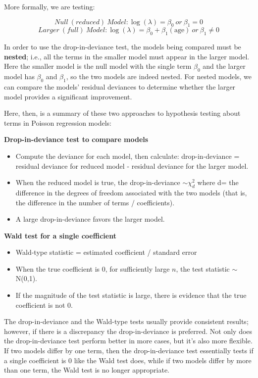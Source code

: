 \documentclass[
]{krantz}
\providecommand{\tightlist}{%
  \setlength{\itemsep}{0pt}\setlength{\parskip}{0pt}}
\begin{document}
More formally, we are testing:

\[Null \ (reduced) \ Model: \log(\lambda) = \beta_0 \ or \ \beta_1=0\]
\[Larger \ (full) \ Model: \log(\lambda) = \beta_0 + \beta_1(\textrm{age}) \ or \ \beta_1 \neq 0 \]

In order to use the drop-in-deviance test, the models being compared must be \textbf{nested}; i.e., all the terms in the smaller model must appear in the larger model. Here the smaller model is the null model with the single term \(\beta_0\) and the larger model has \(\beta_0\) and \(\beta_1\), so the two models are indeed nested. For nested models, we can compare the models' residual deviances to determine whether the larger model provides a significant improvement.

Here, then, is a summary of these two approaches to hypothesis testing about terms in Poisson regression models:

\textbf{Drop-in-deviance test to compare models}

\begin{itemize}
\tightlist
\item
  Compute the deviance for each model, then calculate: drop-in-deviance = residual deviance for reduced model - residual deviance for the larger model.
\item
  When the reduced model is true, the drop-in-deviance \(\sim \chi^2_d\)
  where d= the difference in the degrees of freedom associated with the two models (that is, the difference in the number of terms / coefficients).
\item
  A large drop-in-deviance favors the larger model.
\end{itemize}

\textbf{Wald test for a single coefficient}

\begin{itemize}
\tightlist
\item
  Wald-type statistic = estimated coefficient / standard error
\item
  When the true coefficient is 0, for sufficiently large \(n\), the test statistic \(\sim\) N(0,1).
\item
  If the magnitude of the test statistic is large, there is evidence that the true coefficient is not 0.
\end{itemize}

The drop-in-deviance and the Wald-type tests usually provide consistent results; however, if there is a discrepancy the drop-in-deviance is preferred. Not only does the drop-in-deviance test perform better in more cases, but it's also more flexible. If two models differ by one term, then the drop-in-deviance test essentially tests if a single coefficient is 0 like the Wald test does, while if two models differ by more than one term, the Wald test is no longer appropriate.
\end{document}
